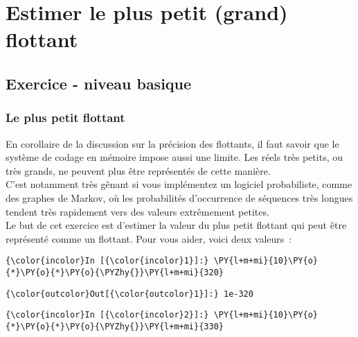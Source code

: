     \hypertarget{estimer-le-plus-petit-grand-flottant}{%
\section{Estimer le plus petit (grand)
flottant}\label{estimer-le-plus-petit-grand-flottant}}

    \hypertarget{exercice---niveau-basique}{%
\subsection{Exercice - niveau basique}\label{exercice---niveau-basique}}

    \hypertarget{le-plus-petit-flottant}{%
\subsubsection{Le plus petit flottant}\label{le-plus-petit-flottant}}

    En corollaire de la discussion sur la précision des flottants, il faut
savoir que le système de codage en mémoire impose aussi une limite. Les
réels très petits, ou très grands, ne peuvent plus être représentés de
cette manière.\\

C'est notamment très gênant si vous implémentez un logiciel
probabiliste, comme des graphes de Markov, où les probabilités
d'occurrence de séquences très longues tendent très rapidement vers des
valeurs extrêmement petites.\\

    Le but de cet exercice est d'estimer la valeur du plus petit flottant
qui peut être représenté comme un flottant. Pour vous aider, voici deux
valeurs~:

    \begin{Verbatim}[commandchars=\\\{\}]
{\color{incolor}In [{\color{incolor}1}]:} \PY{l+m+mi}{10}\PY{o}{*}\PY{o}{*}\PY{o}{\PYZhy{}}\PY{l+m+mi}{320}
\end{Verbatim}


\begin{Verbatim}[commandchars=\\\{\}]
{\color{outcolor}Out[{\color{outcolor}1}]:} 1e-320
\end{Verbatim}
            
    \begin{Verbatim}[commandchars=\\\{\}]
{\color{incolor}In [{\color{incolor}2}]:} \PY{l+m+mi}{10}\PY{o}{*}\PY{o}{*}\PY{o}{\PYZhy{}}\PY{l+m+mi}{330}
\end{Verbatim}


